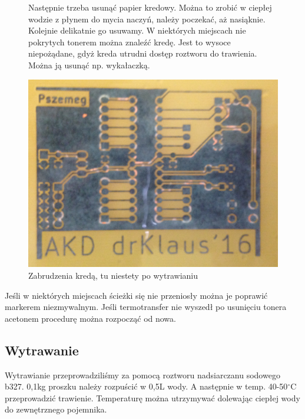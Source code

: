 \documentclass[a4paper,11pt]{article}
\def\SCALE{0.6}
\begin{document}
\begin{figure}[H]
Następnie trzeba usunąć papier kredowy. Można to zrobić w ciepłej wodzie z płynem do mycia naczyń, należy poczekać, aż nasiąknie. Kolejnie delikatnie go usuwamy. W niektórych miejscach nie pokrytych tonerem można znaleźć kredę. Jest to wysoce niepożądane, gdyż kreda utrudni dostęp roztworu do trawienia. Można ją usunąć np. wykałaczką.

	\centering
	\includegraphics[width=\SCALE
	\paperwidth]{ZabrudzeniaKreda}
	\caption{Zabrudzenia kredą, tu niestety po wytrawianiu}
\end{figure}


Jeśli w niektórych miejscach ścieżki się nie przeniosły można je poprawić markerem niezmywalnym.
Jeśli termotransfer nie wyszedł po usunięciu tonera acetonem procedurę można rozpocząć od nowa.
\subsection{Wytrawanie}

Wytrawianie przeprowadziliśmy za pomocą roztworu nadsiarczanu sodowego b327. 0,1kg proszku należy rozpuścić w 0,5L wody. A następnie w temp. 40-50$^\circ$C przeprowadzić trawienie. Temperaturę można utrzymywać dolewając ciepłej wody do zewnętrznego pojemnika.
\end{document}
